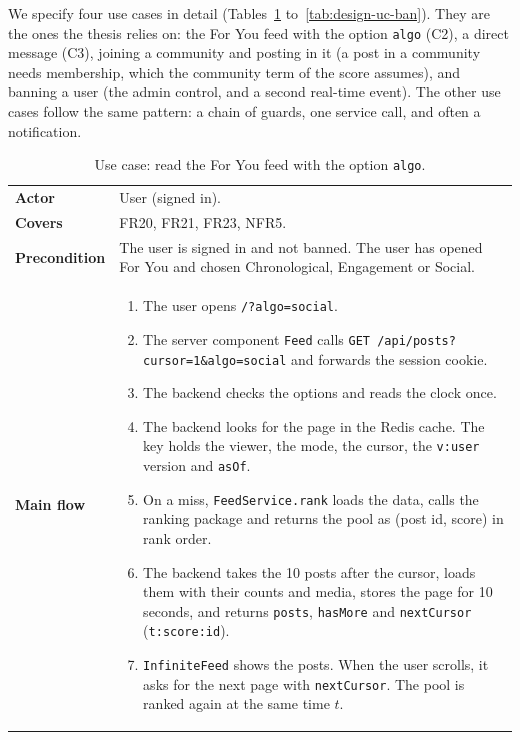 We specify four use cases in detail (Tables~\ref{tab:design-uc-feed} to~\ref{tab:design-uc-ban}). They are the ones the thesis relies on: the For You feed with the option \texttt{algo} (C2), a direct message (C3), joining a community and posting in it (a post in a community needs membership, which the community term of the score assumes), and banning a user (the admin control, and a second real-time event). The other use cases follow the same pattern: a chain of guards, one service call, and often a notification.

{\small\singlespacing
\begin{longtable}{@{}>{\raggedright\arraybackslash}p{2.5cm} >{\raggedright\arraybackslash}p{\dimexpr\textwidth-2.5cm-2\tabcolsep\relax}@{}}
  \caption{Use case: read the For You feed with the option \texttt{algo}.}
  \label{tab:design-uc-feed}\\
  \toprule
  \textbf{Actor} & User (signed in). \\
  \textbf{Covers} & FR20, FR21, FR23, NFR5. \\
  \midrule
  \textbf{Precondition} & The user is signed in and not banned. The user has opened For You and chosen Chronological, Engagement or Social. \\
  \midrule
  \textbf{Main flow} &
  \begin{enumerate}[nosep,leftmargin=*,label=\arabic*.]
    \item The user opens \texttt{/?algo=social}.
    \item The server component \texttt{Feed} calls \texttt{GET /api/posts?cursor=1\&algo=social} and forwards the session cookie.
    \item The backend checks the options and reads the clock once.
    \item The backend looks for the page in the Redis cache. The key holds the viewer, the mode, the cursor, the \texttt{v:user} version and \texttt{asOf}.
    \item On a miss, \texttt{FeedService.rank} loads the data, calls the ranking package and returns the pool as (post id, score) in rank order.
    \item The backend takes the 10 posts after the cursor, loads them with their counts and media, stores the page for 10 seconds, and returns \texttt{posts}, \texttt{hasMore} and \texttt{nextCursor} (\texttt{t:score:id}).
    \item \texttt{InfiniteFeed} shows the posts. When the user scrolls, it asks for the next page with \texttt{nextCursor}. The pool is ranked again at the same time $t$.

\end{enumerate}
\end{longtable}}
